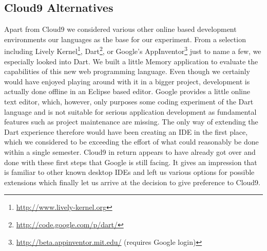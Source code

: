 \subsection{Cloud9 Alternatives}
Apart from Cloud9 we considered various other online based development environments our languages as the base for our experiment. From a selection including Lively Kernel\footnote{\url{http://www.lively-kernel.org}}, Dart\footnote{\url{http://code.google.com/p/dart/}}, or Google's AppInventor\footnote{\url{http://beta.appinventor.mit.edu/} (requires Google login)} just to name a few, we especially looked into Dart. We built a little Memory application to evaluate the capabilities of this new web programming language. Even though we certainly would have enjoyed playing around with it in a bigger project, development is actually done offline in an Eclipse based editor. Google provides a little online text editor, which, however, only purposes some coding experiment of the Dart language and is not suitable for serious application development as fundamental features such as project maintenance are missing. The only way of extending the Dart experience therefore would have been creating an IDE in the first place, which we considered to be exceeding the effort of what could reasonably be done within a single semester. Cloud9 in return appears to have already got over and done with these first steps that Google is still facing. It gives an impression that is familiar to other known desktop IDEs and left us various options for possible extensions which finally let us arrive at the decision to give preference to Cloud9.